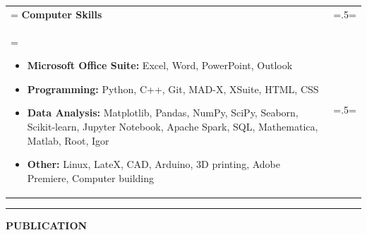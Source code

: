 \documentclass[letterpaper, 11pt]{article}
\begin{document}
\begin{tabularx}{1.0\textwidth} { 
   >{\raggedright\arraybackslash\hsize=1.5\hsize\linewidth=\hsize}X 
   >{\raggedleft\arraybackslash\hsize=.5\hsize\linewidth=\hsize}X }
\normalsize
\bf{Computer Skills} & \\
\normalfont \begin{itemize}[leftmargin=*,noitemsep,topsep=0pt]
\item \textbf{Microsoft Office Suite:}  Excel, Word, PowerPoint, Outlook
\item \textbf{Programming:} Python, C++, Git, MAD-X, XSuite, HTML, CSS
\item \textbf{Data Analysis:} Matplotlib, Pandas, NumPy, SciPy, Seaborn, Scikit-learn, Jupyter Notebook, Apache Spark, SQL, Mathematica, Matlab, Root, Igor
\item \textbf{Other:} Linux, LateX, CAD, Arduino, 3D printing, Adobe Premiere, Computer building
\end{itemize} & 
\end{tabularx}

\newpage
\begin{center}
\noindent\rule{0.75\textwidth}{1pt}
\end{center}

\begin{center}
\large\bf{PUBLICATION}
\end{center}

\nocite{*}

\printbibliography[keyword=primaryauthor, title=\normalsize Primary Author, heading=subbibliography]
\printbibliography[keyword=secondaryauthor, title=\normalsize Co-Author, heading=subbibliography]


\end{document}
